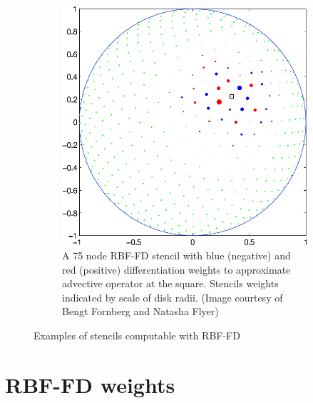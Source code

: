 \documentclass{report}
\begin{document}
{\begin{figure}[htbp]
\begin{subfigure}[m]{0.35\textwidth}
		\includegraphics[width=1.0\textwidth]{../figures/chapter2/RBFFD_single-eps-converted-to.pdf}
		\caption{A 75 node RBF-FD stencil with blue (negative) and red (positive) differentiation weights to approximate advective operator at the square. Stencils weights indicated by scale of disk radii. (Image courtesy of Bengt Fornberg and Natasha Flyer)}
		\label{fig:stencil_example_sphere}
	\end{subfigure}
	\caption{Examples of stencils computable with RBF-FD }
	\label{fig:stencil_example}
\end{figure}


\section{RBF-FD weights}
\label{sec:rbffd}

}
\end{document}
